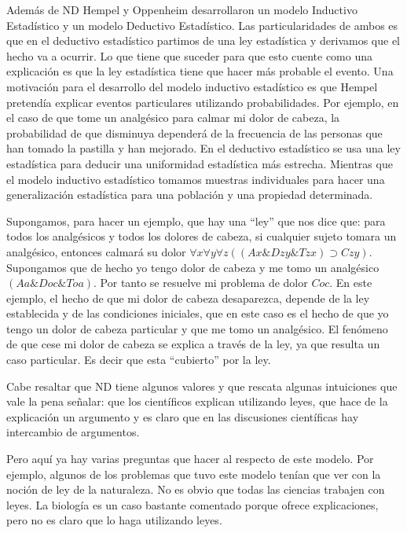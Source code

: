 {Además de ND Hempel y Oppenheim desarrollaron un modelo Inductivo Estadístico y un modelo Deductivo Estadístico. Las particularidades de ambos es que en el deductivo estadístico partimos de una ley estadística y derivamos que el hecho va a ocurrir. Lo que tiene que suceder para que esto cuente como una explicación es que la ley estadística tiene que hacer más probable el evento. Una motivación para el desarrollo del modelo inductivo estadístico es que Hempel pretendía explicar eventos particulares utilizando probabilidades. Por ejemplo, en el caso de que tome un analgésico para calmar mi dolor de cabeza, la probabilidad de que disminuya dependerá de la frecuencia de las personas que han tomado la pastilla y han mejorado. En el deductivo estadístico se usa una ley estadística para deducir una uniformidad estadística más estrecha. Mientras que el modelo inductivo estadístico tomamos muestras individuales para hacer una generalización estadística para una población y una propiedad determinada.

Supongamos, para hacer un ejemplo, que hay una ``ley'' que nos dice que: para todos los analgésicos y todos los dolores de cabeza, si cualquier sujeto tomara un analgésico, entonces calmará su dolor $\forall{x}\forall{y}\forall{z}((Ax\&Dzy\&Tzx)\supset Czy)$. Supongamos que de hecho yo tengo dolor de cabeza y me tomo un analgésico $(Aa \& Doc \& Toa)$. Por tanto se resuelve mi problema de dolor $Coc$. En este ejemplo, el hecho de que mi dolor de cabeza desaparezca, depende de la ley establecida y de las condiciones iniciales, que en este caso es el hecho de que yo tengo un dolor de cabeza particular y que me tomo un analgésico. El fenómeno de que cese mi dolor de cabeza se explica a través de la ley, ya que resulta un caso particular. Es decir que esta ``cubierto'' por la ley.

Cabe resaltar que ND tiene algunos valores y que rescata algunas intuiciones que vale la pena señalar: que los científicos explican utilizando leyes, que hace de la explicación un argumento y es claro que en las discusiones científicas hay intercambio de argumentos.

Pero aquí ya hay varias preguntas que hacer al respecto de este modelo. Por ejemplo, algunos de los problemas que tuvo este modelo tenían que ver con la noción de ley de la naturaleza. No es obvio que todas las ciencias trabajen con leyes. La biología es un caso bastante comentado porque ofrece explicaciones, pero no es claro que lo haga utilizando leyes.

}
